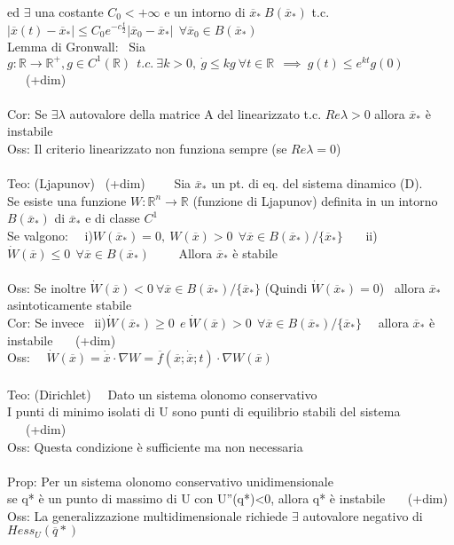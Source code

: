 \documentclass{article}
\theoremstyle{unnumbered}
\theoremstyle{unnumbered1}
\begin{document}
ed $\exists$ una costante $C_0<+\infty$ e un intorno di $\overline{x}_* \  B(\overline{x}_*)$ t.c. \ $|\overline{x}(t)-\overline{x}_*| \le C_0 e^{-c\frac{t}{2}}|\overline{x}_0-\overline{x}_*| \ \ \forall \overline{x}_0 \in B(\overline{x}_*)$ \\
%
Lemma di Gronwall: \
Sia $g:\mathbb{R}\rightarrow\mathbb{R}^+, g\in C^1(\mathbb{R}) \ \ t.c. \ \exists k>0, \ \dot{g}\le kg \ \forall t \in \mathbb{R} \ \ \implies \ g(t)\le e^{kt}g(0)$ \ \ \ (+dim)\\ \\
%
%
%
Cor: Se $\exists \lambda$ autovalore della matrice A del linearizzato t.c. $Re\lambda>0$ allora $\overline{x}_*$ è instabile\\
%
Oss: Il criterio linearizzato non funziona sempre (se $Re\lambda=0$)\\ \\
%
%
%
Teo: (Ljapunov) \ (+dim) \ \ \ \ Sia $\overline{x}_*$ un pt.\! di eq.\! del sistema dinamico (D). \\ Se esiste una funzione $W:\mathbb{R}^n\rightarrow\mathbb{R}$ (funzione di Ljapunov) definita in un intorno $B(\overline{x}_*)$ di $\overline{x}_*$ e di classe $C^1$ \\ Se valgono: \ \
i)$W(\overline{x}_*) = 0 , \ W(\overline{x})>0 \ \ \forall \overline{x} \in B(\overline{x}_*)/\{\overline{x}_*\}$ \ \ \
ii)$\dot{W}(\overline{x})\le 0 \ \ \forall \overline{x} \in B(\overline{x}_*) $ \ \ \ \ Allora $\overline{x}_*$ è stabile \\ \\
%
%
%
Oss: Se inoltre $\dot{W}(\overline{x})<0 \ \forall \overline{x}\in B(\overline{x}_*)/\{\overline{x}_*\}$ (Quindi $\dot{W}(\overline{x}_*)=0$) \ allora $\overline{x}_*$ asintoticamente stabile \\
%
Cor: Se invece \ ii)$\dot{W}(\overline{x}_*)\ge 0 \ \ e \ \dot{W}(\overline{x})>0 \ \ \forall \overline{x} \in B(\overline{x}_*)/\{\overline{x}_*\}$ \ \ allora $\overline{x}_*$ è instabile \ \ \ (+dim) \\
Oss: \ \ $\dot{W}(\overline{x})=\dot{\overline{x}}\cdot \nabla W = \overline{f}(\overline{x};\dot{\overline{x}};t)\cdot \nabla W(\overline{x}) $\\ \\
%
%
%
Teo: (Dirichlet) \ \ Dato un sistema olonomo conservativo\\ I punti di minimo isolati di U sono punti di equilibrio stabili del sistema \ \ \ (+dim)\\
%
Oss: Questa condizione è sufficiente ma non necessaria \\ \\
%
%
%
Prop: Per un sistema olonomo conservativo unidimensionale\\
\phantom{Prop: }se q* è un punto di massimo di U con U''(q*)<0, allora q* è instabile \ \ \ (+dim)\\
%
Oss: La generalizzazione multidimensionale richiede $\exists$ autovalore negativo di $Hess_U(\overline{q}*)$ \\
\end{document}
